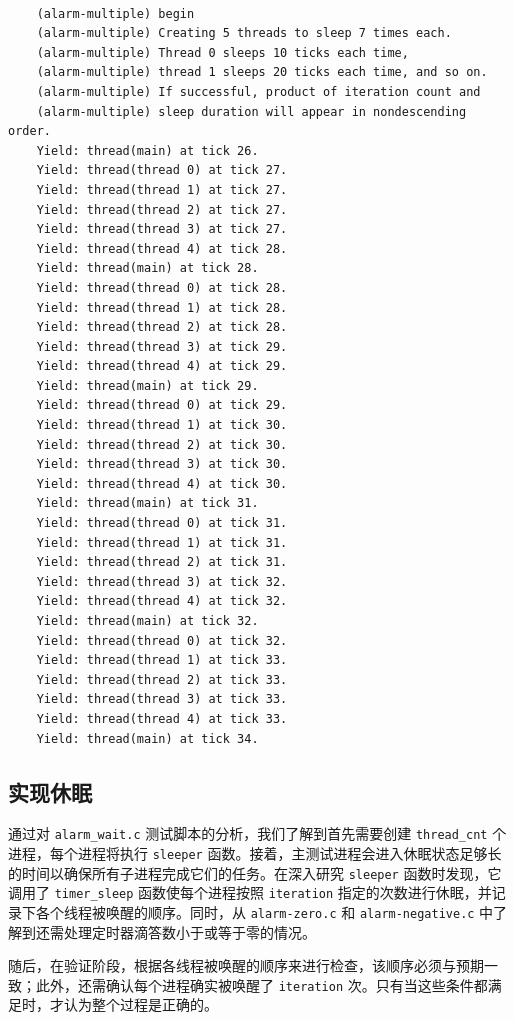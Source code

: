 \documentclass{article}
\begin{document}
\

\begin{lstlisting}
	(alarm-multiple) begin
	(alarm-multiple) Creating 5 threads to sleep 7 times each.
	(alarm-multiple) Thread 0 sleeps 10 ticks each time,
	(alarm-multiple) thread 1 sleeps 20 ticks each time, and so on.
	(alarm-multiple) If successful, product of iteration count and
	(alarm-multiple) sleep duration will appear in nondescending order.
	Yield: thread(main) at tick 26.
	Yield: thread(thread 0) at tick 27.
	Yield: thread(thread 1) at tick 27.
	Yield: thread(thread 2) at tick 27.
	Yield: thread(thread 3) at tick 27.
	Yield: thread(thread 4) at tick 28.
	Yield: thread(main) at tick 28.
	Yield: thread(thread 0) at tick 28.
	Yield: thread(thread 1) at tick 28.
	Yield: thread(thread 2) at tick 28.
	Yield: thread(thread 3) at tick 29.
	Yield: thread(thread 4) at tick 29.
	Yield: thread(main) at tick 29.
	Yield: thread(thread 0) at tick 29.
	Yield: thread(thread 1) at tick 30.
	Yield: thread(thread 2) at tick 30.
	Yield: thread(thread 3) at tick 30.
	Yield: thread(thread 4) at tick 30.
	Yield: thread(main) at tick 31.
	Yield: thread(thread 0) at tick 31.
	Yield: thread(thread 1) at tick 31.
	Yield: thread(thread 2) at tick 31.
	Yield: thread(thread 3) at tick 32.
	Yield: thread(thread 4) at tick 32.
	Yield: thread(main) at tick 32.
	Yield: thread(thread 0) at tick 32.
	Yield: thread(thread 1) at tick 33.
	Yield: thread(thread 2) at tick 33.
	Yield: thread(thread 3) at tick 33.
	Yield: thread(thread 4) at tick 33.
	Yield: thread(main) at tick 34.
\end{lstlisting}

\subsection{实现休眠}

通过对 \texttt{alarm\_wait.c} 测试脚本的分析，我们了解到首先需要创建 \texttt{thread\_cnt} 个进程，每个进程将执行 \texttt{sleeper} 函数。接着，主测试进程会进入休眠状态足够长的时间以确保所有子进程完成它们的任务。在深入研究 \texttt{sleeper} 函数时发现，它调用了 \texttt{timer\_sleep} 函数使每个进程按照 \texttt{iteration} 指定的次数进行休眠，并记录下各个线程被唤醒的顺序。同时，从 \texttt{alarm-zero.c} 和 \texttt{alarm-negative.c} 中了解到还需处理定时器滴答数小于或等于零的情况。

随后，在验证阶段，根据各线程被唤醒的顺序来进行检查，该顺序必须与预期一致；此外，还需确认每个进程确实被唤醒了 \texttt{iteration} 次。只有当这些条件都满足时，才认为整个过程是正确的。
\end{document}
